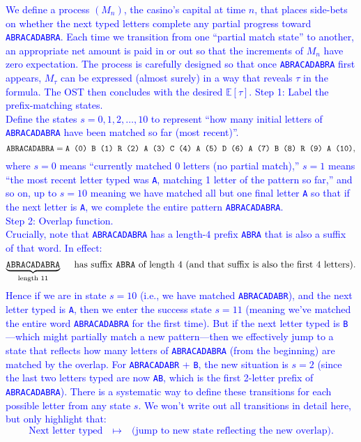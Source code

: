 \documentclass{article}
\begin{document}
\begin{enumerate}
    \textcolor{blue}{
        We define a process $(M_n)$, the casino's capital at time $n$, that places side-bets on whether the next typed letters complete any partial progress toward \texttt{ABRACADABRA}. Each time we transition from one ``partial match state'' to another, an appropriate net amount is paid in or out so that the increments of $M_n$ have zero expectation. The process is carefully designed so that once \texttt{ABRACADABRA} first appears, $M_\tau$ can be expressed (almost surely) in a way that reveals $\tau$ in the formula. The OST then concludes with the desired $\mathbb{E}[\tau]$.
\bigskip
Step 1: Label the prefix-matching states. \\
Define the states $s=0,1,2,\ldots,10$ to represent ``how many initial letters of \texttt{ABRACADABRA} have been matched so far (most recent)''. 
\[
\text{\tt ABRACADABRA} = 
\text{\tt A (0) B (1) R (2) A (3) C (4) A (5) D (6) A (7) B (8) R (9) A (10)},
\]
where $s=0$ means ``currently matched 0 letters (no partial match),'' $s=1$ means ``the most recent letter typed was \texttt{A}, matching 1 letter of the pattern so far,'' and so on, up to $s=10$ meaning we have matched all but one final letter \texttt{A} so that if the next letter is \texttt{A}, we complete the entire pattern \texttt{ABRACADABRA}. \\
\bigskip
Step 2: Overlap function. \\
Crucially, note that \texttt{ABRACADABRA} has a length-$4$ prefix \texttt{ABRA} that is also a suffix of that word. In effect:
\[
\underbrace{\text{\tt ABRACADABRA}}_{\text{length 11}}
\quad\text{ has suffix \texttt{ABRA} of length 4 (and that suffix is also the first 4 letters).}
\]
Hence if we are in state $s=10$ (i.e., we have matched \texttt{ABRACADABR}), and the next letter typed is \texttt{A}, then we enter the success state $s=11$ (meaning we've matched the entire word \texttt{ABRACADABRA} for the first time). But if the next letter typed is \texttt{B}---which might partially match a new pattern---then we effectively jump to a state that reflects how many letters of \texttt{ABRACADABRA} (from the beginning) are matched by the overlap. For \texttt{ABRACADABR} + \texttt{B}, the new situation is $s=2$ (since the last two letters typed are now \texttt{AB}, which is the first 2-letter prefix of \texttt{ABRACADABRA}). There is a systematic way to define these transitions for each possible letter from any state $s$. We won't write out all transitions in detail here, but only highlight that:
\[
\text{Next letter typed} 
\quad\longmapsto\quad
\text{(jump to new state reflecting the new overlap).} 
\]}
\end{enumerate}
\end{document}
